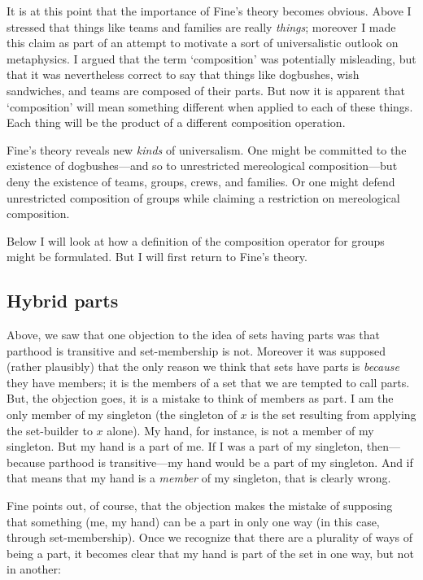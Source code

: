 \documentclass[11pt]{article}
\begin{document}
\begin{spacing}{1.25}
It is at this point that the importance of Fine's theory becomes
obvious.  Above I stressed that things like teams and families are
really {\em things}; moreover I made this claim as part of an attempt
to motivate a sort of universalistic outlook on metaphysics.  I argued
that the term `composition' was potentially misleading, but that it
was nevertheless correct to say that things like dogbushes, wish
sandwiches, and teams are composed of their parts.  But now it is
apparent that `composition' will mean something different when applied
to each of these things.  Each thing will be the product of a
different composition operation.

Fine's theory reveals new {\em kinds} of universalism.  One might be
committed to the existence of dogbushes---and so to unrestricted
mereological composition---but deny the existence of teams, groups,
crews, and families.  Or one might defend unrestricted composition of
groups while claiming a restriction on mereological composition.

Below I will look at how a definition of the composition operator for
groups might be formulated.  But I will first return to Fine's theory.

\subsection{Hybrid parts}
\label{hybrid}
Above, we saw that one objection to the idea of sets having parts was
that parthood is transitive and set-membership is not.  Moreover it
was supposed (rather plausibly) that the only reason we think that
sets have parts is {\em because} they have members; it is the members
of a set that we are tempted to call parts.  But, the objection goes,
it is a mistake to think of members as part.  I am the only member of
my singleton (the singleton of $x$ is the set resulting from applying
the set-builder to $x$ alone).  My hand, for instance, is not a member
of my singleton.  But my hand is a part of me.  If I was a part of my
singleton, then---because parthood is transitive---my hand would be a
part of my singleton.  And if that means that my hand is a {\em
  member} of my singleton, that is clearly wrong.

Fine points out, of course, that the objection makes the mistake of
supposing that something (me, my hand) can be a part in only one way
(in this case, through set-membership).  Once we recognize that there
are a plurality of ways of being a part, it becomes clear that my hand
is part of the set in one way, but not in another:


\end{spacing}
\end{document}
